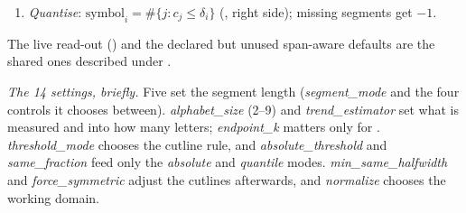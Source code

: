 \begin{enumerate}
\begin{itemize}
    \emph{quantile} mode: a band wide enough that every segment is the middle letter;
  \item all deltas equal but not zero (a clean ramp): equal-width cutlines across
    $[-|v|, |v|]$, so the ramp reads all-up or all-down;
  \item \emph{learned}: pSAX's quantiser on the deltas, unchanged (Epanechnikov density,
    k-means++ start with the fixed seed, Lloyd--Max; see );
  \item \emph{absolute}: $\pm\,\text{absolute\_threshold}/\sigma$ (the threshold is in raw
    units of rise per segment);
  \item \emph{quantile}: for $k=3$ the $\tfrac{1-f}{2}$ and $\tfrac{1+f}{2}$ quantiles with
    $f$ = \emph{same\_fraction}; for $k>3$ equiprobable quantiles $j/k$.
  \end{itemize}
  With \emph{force\_symmetric} on (learned and quantile modes), fold the cutlines about zero:
  $c'_j = (c_j - c_{k-2-j})/2$. Then widen the middle band to at least
  $\pm$\emph{min\_same\_halfwidth} if one is given (odd $k$ only), and nudge any cutlines
  that collide apart by $10^{-9}$ of their scale.
\item \emph{Quantise}: $\text{symbol}_i = \#\{j : c_j \leq \delta_i\}$
  (, right side); missing segments get $-1$.
\end{enumerate}
The live read-out () and the declared but unused span-aware defaults
are the shared ones described under .

\emph{The 14 settings, briefly.} Five set the segment length (\emph{segment\_mode} and the
four controls it chooses between). \emph{alphabet\_size} (2--9) and \emph{trend\_estimator}
set what is measured and into how many letters; \emph{endpoint\_k} matters only for
. \emph{threshold\_mode} chooses the cutline rule, and
\emph{absolute\_threshold} and \emph{same\_fraction} feed only the \emph{absolute} and
\emph{quantile} modes. \emph{min\_same\_halfwidth} and \emph{force\_symmetric} adjust the
cutlines afterwards, and \emph{normalize} chooses the working domain.

